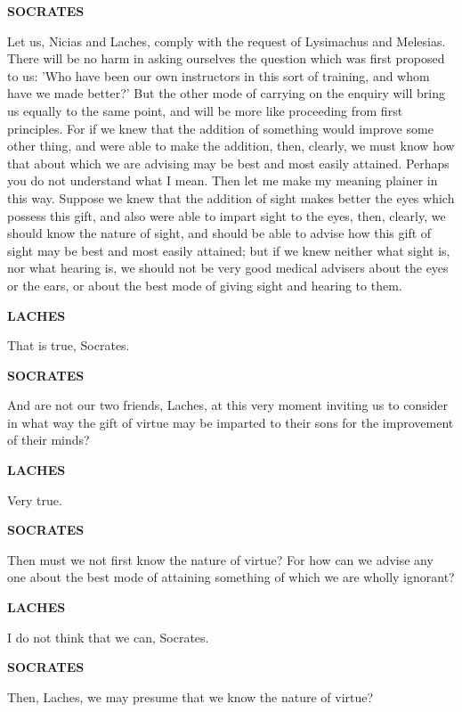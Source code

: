 \documentclass[11pt,letter]{article}
\begin{document}
\par \textbf{SOCRATES}
\par   Let us, Nicias and Laches, comply with the request of Lysimachus and Melesias. There will be no harm in asking ourselves the question which was first proposed to us:  'Who have been our own instructors in this sort of training, and whom have we made better?' But the other mode of carrying on the enquiry will bring us equally to the same point, and will be more like proceeding from first principles. For if we knew that the addition of something would improve some other thing, and were able to make the addition, then, clearly, we must know how that about which we are advising may be best and most easily attained. Perhaps you do not understand what I mean. Then let me make my meaning plainer in this way. Suppose we knew that the addition of sight makes better the eyes which possess this gift, and also were able to impart sight to the eyes, then, clearly, we should know the nature of sight, and should be able to advise how this gift of sight may be best and most easily attained; but if we knew neither what sight is, nor what hearing is, we should not be very good medical advisers about the eyes or the ears, or about the best mode of giving sight and hearing to them.

\par \textbf{LACHES}
\par   That is true, Socrates.

\par \textbf{SOCRATES}
\par   And are not our two friends, Laches, at this very moment inviting us to consider in what way the gift of virtue may be imparted to their sons for the improvement of their minds?

\par \textbf{LACHES}
\par   Very true.

\par \textbf{SOCRATES}
\par   Then must we not first know the nature of virtue? For how can we advise any one about the best mode of attaining something of which we are wholly ignorant?

\par \textbf{LACHES}
\par   I do not think that we can, Socrates.

\par \textbf{SOCRATES}
\par   Then, Laches, we may presume that we know the nature of virtue?
\end{document}
